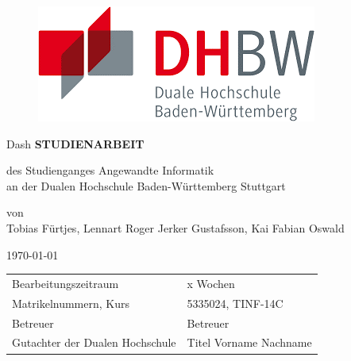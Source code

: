 \begin{figure}[!htb]
%
  \includegraphics[width=\linewidth]{DHBW-Logo.png}
  \label{fig:awesome_image3}
\endminipage
\end{figure}

\begin{center}
\vfill
{\Large Dash}
\vfill
\textbf{STUDIENARBEIT}
\vfill

des Studienganges Angewandte Informatik\\
\vspace{12pt}
an der Dualen Hochschule Baden-Württemberg Stuttgart
\vfill

von\\
\vspace{12pt}
Tobias Fürtjes, Lennart Roger Jerker Gustafsson, Kai Fabian Oswald
\vfill

\today
\vfill

\begin{tabular}{ll}
Bearbeitungszeitraum & x Wochen \\
Matrikelnummern, Kurs & 5335024, TINF-14C \\
Betreuer & Betreuer \\
Gutachter der Dualen Hochschule	& Titel Vorname Nachname \\
\end{tabular}

\end{center}